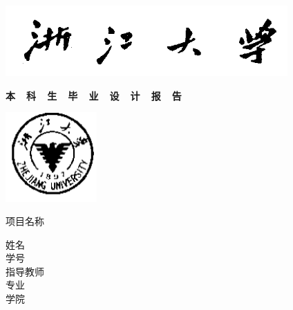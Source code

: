 \thispagestyle{empty}

{
\setlength{\parindent}{0em}
\renewcommand{\baselinestretch}{2}

\vspace*{12mm}

\begin{center}
  \includegraphics[width=108mm]{data/cover/xiaoming}
\end{center}

\vspace{-14mm}

{
\renewcommand{\baselinestretch}{1.8}
\songti\erhao\bfseries
\centering
本~~科~~生~~毕~~业~~设~~计~~报~~告 \par
}

\vspace{1.5em}

\begin{center}
  \includegraphics[width=35mm]{data/cover/xiaobiao}
\end{center}

\vspace{4em}

{
\renewcommand{\baselinestretch}{2.2}
\songti\xiaosan
\centering
项目名称 \; \underline{\makebox[22em]{\zjutitlec}} \par
\sihao
姓\hspace{2em}名 \; \underline{\makebox[16em]{\zjuauthornamec}} \\
学\hspace{2em}号 \; \underline{\makebox[16em]{\zjuauthorid}} \\
指导教师 \; \underline{\makebox[16em]{\zjumentorc}} \\
专\hspace{2em}业 \; \underline{\makebox[16em]{\zjumajorc}} \\
学\hspace{2em}院 \; \underline{\makebox[16em]{\zjucollegec}} \par
}
}
